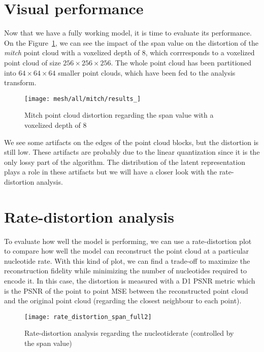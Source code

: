 
\label{sec:performance}


\section{Visual performance}

Now that we have a fully working model, it is time to evaluate its performance. On the Figure~\ref{fig:mitch-all}, we can see the impact of the span value on the distortion of the \textit{mitch} point cloud with a voxelized depth of $8$, which corrresponds to a voxelized point cloud of size $256 \times 256 \times 256$. 
The whole point cloud has been partitioned into $64 \times 64 \times 64$ smaller point clouds, which have been fed to the analysis transform.

\begin{figure}[ht]
    \centering
    \texttt{[image: mesh/all/mitch/results\_]}
    \caption{Mitch point cloud distortion regarding the span value with a voxelized depth of $8$}
    \label{fig:mitch-all}
\end{figure}

We see some artifacts on the edges of the point cloud blocks, but the distortion is still low. These artifacts are probably due to the linear quantization since it is the only lossy part of the algorithm. The distribution of the latent representation plays a role in these artifacts but we will have a closer look with the rate-distortion analysis.

\section{Rate-distortion analysis}

To evaluate how well the model is performing, we can use a rate-distortion plot to compare how well the model can reconstruct the point cloud at a particular nucleotide rate. With this kind of plot, we can find a trade-off to maximize the reconstruction fidelity while minimizing the number of nucleotides required to encode it.
In this case, the distortion is measured with a D1 PSNR metric which is the PSNR of the point to point MSE between the reconstructed point cloud and the original point cloud (regarding the closest neighbour to each point).

\begin{figure}[ht]
    \centering
    \texttt{[image: rate\_distortion\_span\_full2]}
    \caption{Rate-distortion analysis regarding the nucleotiderate (controlled by the span value)}
    \label{fig:rate-distortion}
\end{figure}

